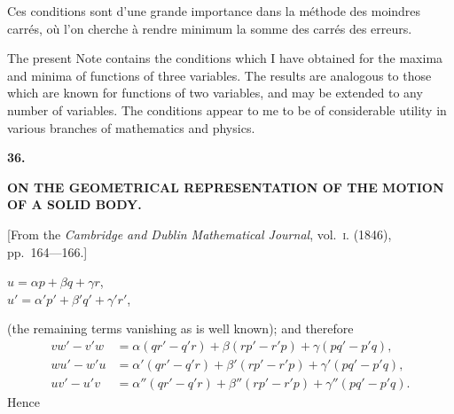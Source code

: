 \documentclass[11pt,a4paper]{article}
\begin{document}
Ces conditions sont d'une grande importance dans la m\'{e}thode des moindres carr\'{e}s,
o\`{u} l'on cherche \`{a} rendre minimum la somme des carr\'{e}s des erreurs.

\newpage
\setcounter{page}{236}

The present Note contains the conditions which I have obtained for the maxima
and minima of functions of three variables. The results are analogous to those which
are known for functions of two variables, and may be extended to any number of
variables. The conditions appear to me to be of considerable utility in various branches
of mathematics and physics.


\newpage
{}
\setcounter{page}{236}

\begin{center}
{\large\bfseries 36.}
\end{center}
\vspace{0.5em}
\begin{center}
{\large\bfseries ON THE GEOMETRICAL REPRESENTATION OF THE MOTION\\[0.3em]
OF A SOLID BODY.}
\end{center}
\vspace{0.5em}
\begin{center}
{[From the \textit{Cambridge and Dublin Mathematical Journal}, vol.~\textsc{i}. (1846),\\
pp.~164---166.]}
\end{center}
\vspace{1em}

\begin{center}
$u = \alpha p + \beta q + \gamma r$,\\[0.3em]
$u' = \alpha' p' + \beta' q' + \gamma' r'$,
\end{center}
(the remaining terms vanishing as is well known); and therefore
\begin{align*}
vw' - v'w &= \alpha(qr' - q'r) + \beta(rp' - r'p) + \gamma(pq' - p'q),\\
wu' - w'u &= \alpha'(qr' - q'r) + \beta'(rp' - r'p) + \gamma'(pq' - p'q),\\
uv' - u'v &= \alpha''(qr' - q'r) + \beta''(rp' - r'p) + \gamma''(pq' - p'q).
\end{align*}
Hence
\end{document}
